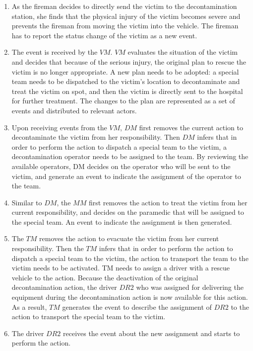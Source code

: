 \begin{enumerate}
	\item As the fireman decides to directly send the victim to the decontamination station, she finds that the physical injury of the victim becomes severe and prevents the fireman from moving the victim into the vehicle. The fireman has to report the status change of the victim as a new event.
	\item The event is received by the $VM$. $VM$ evaluates the situation of the victim and decides that because of the serious injury, the original plan to rescue the victim is no longer appropriate. A new plan needs to be adopted: a special team needs to be dispatched to the victim’s location to decontaminate and treat the victim on spot, and then the victim is directly sent to the hospital for further treatment. The changes to the plan are represented as a set of events and distributed to relevant actors.
	\item Upon receiving events from the $VM$, $DM$ first removes the current action to decontaminate the victim from her responsibility. Then $DM$ infers that in order to perform the action to dispatch a special team to the victim, a decontamination operator needs to be assigned to the team. By reviewing the available operators, DM decides on the operator who will be sent to the victim, and generate an event to indicate the assignment of the operator to the team.
	\item Similar to $DM$, the $MM$ first removes the action to treat the victim from her current responsibility, and decides on the paramedic that will be assigned to the special team. An event to indicate the assignment is then generated.
	\item The $TM$ removes the action to evacuate the victim from her current responsibility. Then the $TM$ infers that in order to perform the action to dispatch a special team to the victim, the action to transport the team to the victim needs to be activated. TM needs to assign a driver with a rescue vehicle to the action. Because the deactivation of the original decontamination action, the driver $DR2$ who was assigned for delivering the equipment during the decontamination action is now available for this action. As a result, $TM$ generates the event to describe the assignment of $DR2$ to the action to transport the special team to the victim.
	\item The driver $DR2$ receives the event about the new assignment and starts to perform the action.
\end{enumerate}

